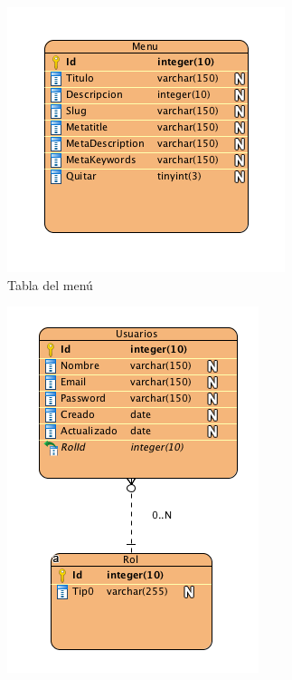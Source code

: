 \begin{figure}
\begin{center}
\includegraphics[scale=0.7]{imagenes/menu.png}
\caption{Tabla del menú}
\label{menu_bd}
\end{center}
\end{figure}

\begin{figure}
\begin{center}
\includegraphics[scale=0.7]{imagenes/Usuarios.png}
\caption{}
\label{users_bd}
\end{center}
\end{figure}

